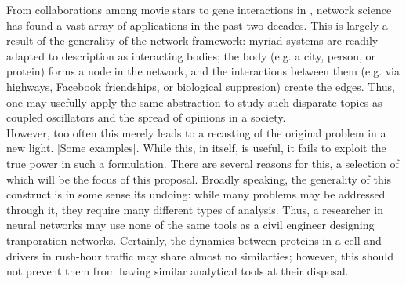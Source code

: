 \documentclass[11pt]{article}
\begin{document}
From collaborations among movie stars \cite{barbasi} to gene interactions in \cite{harvardCelegans}, network science has found a vast array of applications in the past two decades. This is largely a result of the generality of the network framework: myriad systems are readily adapted to description as interacting bodies; the body (e.g. a city, person, or protein) forms a node in the network, and the interactions between them (e.g. via highways, Facebook friendships, or biological suppresion) create the edges. Thus, one may usefully apply the same abstraction to study such disparate topics as coupled oscillators and the spread of opinions in a society. \vspace{1mm}\\
However, too often this merely leads to a recasting of the original problem in a new light. [Some examples]. While this, in itself, is useful, it fails to exploit the true power in such a formulation. There are several reasons for this, a selection of which will be the focus of this proposal. Broadly speaking, the generality of this construct is in some sense its undoing: while many problems may be addressed through it, they require many different types of analysis. Thus, a researcher in neural networks may use none of the same tools as a civil engineer designing tranporation networks. Certainly, the dynamics between proteins in a cell and drivers in rush-hour traffic may share almost no similarties; however, this should not prevent them from having similar analytical tools at their disposal.\vspace{1mm}\\ %
\end{document}
